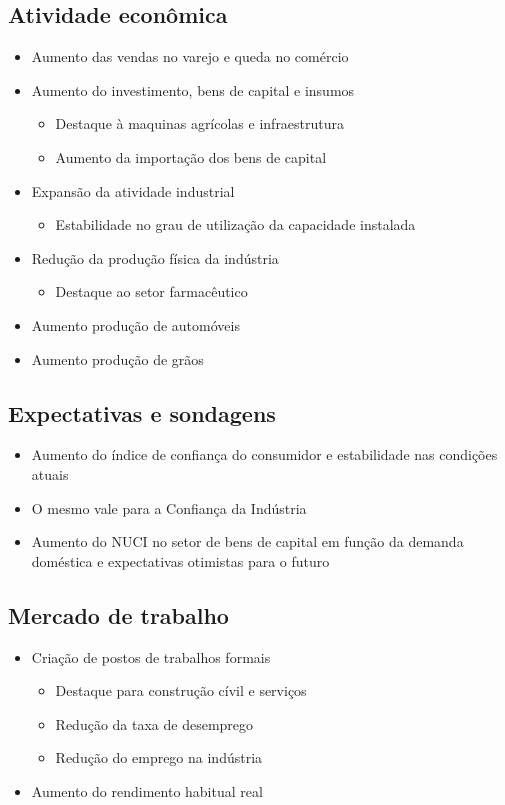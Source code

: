 \documentclass[11pt]{article}
\begin{document}
\subsection*{Atividade econômica}
\label{sec:org81a2b94}
\begin{itemize}
\item Aumento das vendas no varejo e queda no comércio
\item Aumento do investimento, bens de capital e insumos
\begin{itemize}
\item Destaque à maquinas agrícolas e infraestrutura
\item Aumento da importação dos bens de capital
\end{itemize}
\item Expansão da atividade industrial
\begin{itemize}
\item Estabilidade no grau de utilização da capacidade instalada
\end{itemize}
\item Redução da produção física da indústria
\begin{itemize}
\item Destaque ao setor farmacêutico
\end{itemize}
\item Aumento produção de automóveis
\item Aumento produção de grãos
\end{itemize}
\subsection*{Expectativas e sondagens}
\label{sec:orgb241847}
\begin{itemize}
\item Aumento do índice de confiança do consumidor e estabilidade nas condições atuais
\item O mesmo vale para a Confiança da Indústria
\item Aumento do NUCI no setor de bens de capital em função da demanda doméstica e expectativas otimistas para o futuro
\end{itemize}
\subsection*{Mercado de trabalho}
\label{sec:org55b658a}
\begin{itemize}
\item Criação de postos de trabalhos formais
\begin{itemize}
\item Destaque para construção cívil e serviços
\item Redução da taxa de desemprego
\item Redução do emprego na indústria
\end{itemize}
\item Aumento do rendimento habitual real
\end{itemize}
\end{document}
